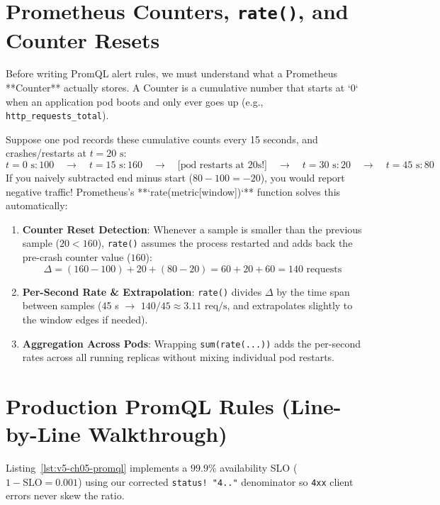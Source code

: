 \section{Prometheus Counters, \texttt{rate()}, and Counter Resets}

Before writing PromQL alert rules, we must understand what a Prometheus **Counter** actually stores. A Counter is a cumulative number that starts at `0` when an application pod boots and only ever goes up (e.g., \texttt{http\_requests\_total}).

Suppose one pod records these cumulative counts every 15 seconds, and crashes/restarts at $t = 20\text{ s}$:
$$t=0\text{ s}: 100 \quad\longrightarrow\quad t=15\text{ s}: 160 \quad\longrightarrow\quad \text{[pod restarts at 20s!]} \quad\longrightarrow\quad t=30\text{ s}: 20 \quad\longrightarrow\quad t=45\text{ s}: 80$$
If you naively subtracted end minus start ($80 - 100 = -20$), you would report negative traffic! Prometheus's **`rate(metric[window])`** function solves this automatically:
\begin{enumerate}[leftmargin=18pt]
  \item \textbf{Counter Reset Detection}: Whenever a sample is smaller than the previous sample ($20 < 160$), \texttt{rate()} assumes the process restarted and adds back the pre-crash counter value ($160$):
  $$\Delta = (160 - 100) + 20 + (80 - 20) = 60 + 20 + 60 = 140\text{ requests}$$
  \item \textbf{Per-Second Rate \& Extrapolation}: \texttt{rate()} divides $\Delta$ by the time span between samples (45 s $\rightarrow$ $140 / 45 \approx 3.11\text{ req/s}$, and extrapolates slightly to the window edges if needed).
  \item \textbf{Aggregation Across Pods}: Wrapping \texttt{sum(rate(...))} adds the per-second rates across all running replicas without mixing individual pod restarts.
\end{enumerate}

\section{Production PromQL Rules (Line-by-Line Walkthrough)}

Listing~\ref{lst:v5-ch05-promql} implements a $99.9\%$ availability SLO ($1 - \text{SLO} = 0.001$) using our corrected \texttt{status!~"4.."} denominator so \texttt{4xx} client errors never skew the ratio.

